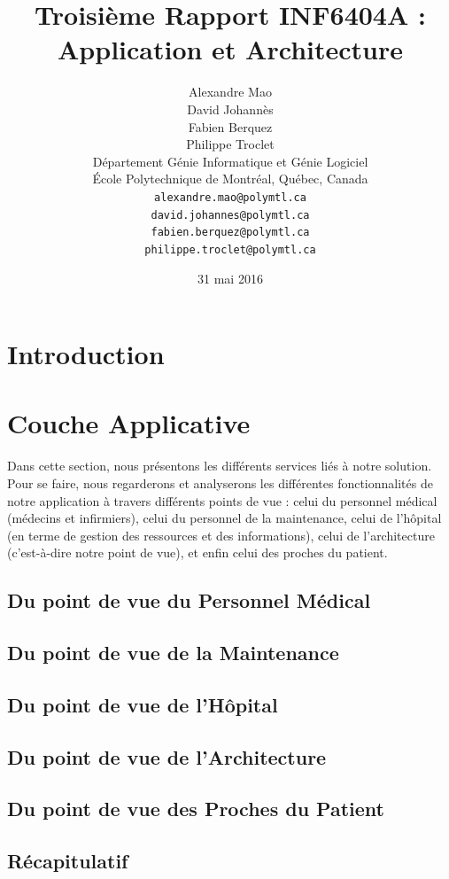 \documentclass{article}
\title{Troisième Rapport INF6404A : Application et Architecture}
\author{
	Alexandre Mao\\
	David Johannès \\
	Fabien Berquez \\
	Philippe Troclet \\
	D\'{e}partement G\'{e}nie Informatique et G\'{e}nie Logiciel \\
	\'{E}cole Polytechnique de Montr\'{e}al, Qu\'{e}bec, Canada \\
	\texttt{alexandre.mao@polymtl.ca}\\
	\texttt{david.johannes@polymtl.ca}\\
	\texttt{fabien.berquez@polymtl.ca}   \\
	\texttt{philippe.troclet@polymtl.ca}   \\
}
\date{31 mai 2016}
\begin{document}
\maketitle

\section{Introduction}


 
\section{Couche Applicative}
Dans cette section, nous présentons les différents services liés à notre solution. Pour se faire, nous regarderons et analyserons les différentes fonctionnalités de notre application à travers différents points de vue : celui du personnel médical (médecins et infirmiers), celui du personnel de la maintenance, celui de l'hôpital (en terme de gestion des ressources et des informations), celui de l'architecture (c'est-à-dire notre point de vue), et enfin celui des proches du patient.

\subsection{Du point de vue du Personnel Médical}

\subsection{Du point de vue de la Maintenance}

\subsection{Du point de vue de l'Hôpital}

\subsection{Du point de vue de l'Architecture}

\subsection{Du point de vue des Proches du Patient}

\subsection{Récapitulatif}

\end{document}
